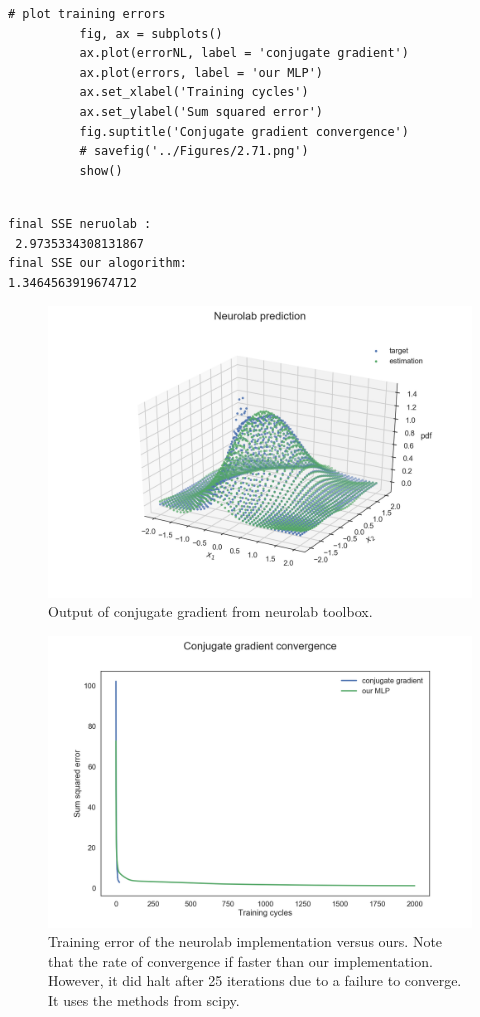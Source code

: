 \documentclass[11pt]{article}
\makeatletter
\def\maxwidth{\ifdim\Gin@nat@width>\linewidth\linewidth
    \else\Gin@nat@width\fi}
\let\Oldincludegraphics\includegraphics
\renewcommand{\includegraphics}[1]{\Oldincludegraphics[width=.8\maxwidth]{#1}}
\makeatother
\begin{document}
\begin{Verbatim}[commandchars=\\\{\}]
          # plot training errors
          fig, ax = subplots()
          ax.plot(errorNL, label = 'conjugate gradient')
          ax.plot(errors, label = 'our MLP')
          ax.set_xlabel('Training cycles')
          ax.set_ylabel('Sum squared error')
          fig.suptitle('Conjugate gradient convergence')
          # savefig('../Figures/2.71.png')
          show()
          
\end{Verbatim}
    \begin{Verbatim}[commandchars=\\\{\}]
final SSE neruolab :
 2.9735334308131867
final SSE our alogorithm:
1.3464563919674712

    \end{Verbatim}
		\begin{figure}[H]
		\centering \includegraphics{../Figures/2.7.png}
		\caption{Output of conjugate gradient from neurolab toolbox.}
		\label{fig:2.7}
	\end{figure}
	
	\begin{figure}[H]
		\centering \includegraphics{../Figures/2.71.png}
		\caption{Training error of the neurolab implementation versus ours. Note that the rate of convergence if faster than our implementation. However, it did halt after 25 iterations due to a failure to converge. It uses the methods from scipy.}
		\label{fig:2.71}
	\end{figure}



    
    
    
    
\end{document}

